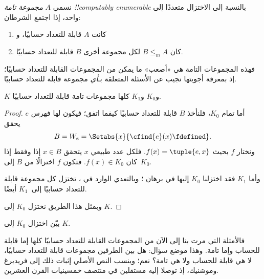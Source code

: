 \documentclass[../../../include/open-logic-section]{subfiles}
\begin{document}

\begin{defn}
نسمي $A$ \emph{مجموعة تامة !!{computably enumerable}}
بالنسبة إلى الاختزال متعددًا إلى واحد، إذا اجتمع الشرطان:
\begin{enumerate}
\item كانت $A$ قابلة للتعداد حسابيًا، و
\item كان $B\leq_m A$ لكل مجموعة أخرى $B$ قابلة للتعداد حسابيًا.
\end{enumerate}
\end{defn}

فهذه المجموعات التامة هي «أصعب» ما يمكن من
المجموعات القابلة للتعداد حسابيًا؛ إذ بمعرفة أجوبتها نجيب عن الأسئلة
المتعلقة بـ\emph{أي} مجموعة قابلة للتعداد حسابيًا.

\begin{thm}
$K$ و$K_0$ و$K_1$ كلها مجموعات تامة قابلة للتعداد حسابيًا.
\end{thm}

\begin{proof}
أما تمام $K_0$، فلنأخذ $B$ قابلة للتعداد حسابيًا كيفما اتفق؛
فيكون لها فهرس $e$ يحقق
\[
B = W_e = \Setabs{x}{\cfind{e}(x) \fdefined}.
\]
ونختار $f$ بحيث $f(x)=\tuple{e,x}$. فلكل عدد طبيعي $x$ يتحقق
$x\in B$ إذا وفقط إذا كان $f(x)\in K_0$. فتكون $f$
اختزالًا من $B$ إلى~$K_0$.

وأما $K_1$ فقد اختزلنا $K_0$ إليها في برهان
؛ وبالتعدي الوارد في ،
تختزل كل مجموعة قابلة للتعداد حسابيًا إلى~$K_1$ أيضًا.

وبمثل هذا الطريق نختزل $K_0$ إلى $K$.
\end{proof}

\begin{prob}
بيّن اختزال $K_0$ إلى $K$.
\end{prob}

\begin{digress}
فالأمثلة التي مرت بنا إلى الآن من المجموعات القابلة للتعداد حسابيًا
كلها إما قابلة للحساب وإما تامة. وهذا موضع سؤال:{}
هل بين الطرفين مجموعات قابلة للتعداد حسابيًا، لا هي قابلة للحساب ولا
هي تامة؟ نعم؛ وينسب النص الأصلي إثبات ذلك إلى فريدبرغ وموشنيك، إذ توصلا إليه مستقلين في
منتصف خمسينيات القرن العشرين.
\end{digress}
\end{document}
